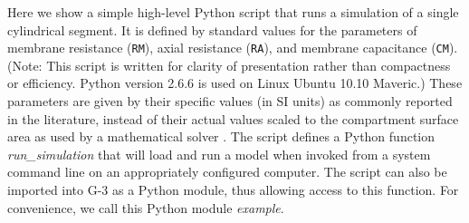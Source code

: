 \documentclass[10pt]{article}
\begin{document}
Here we show a simple high-level Python script that runs a simulation of a single cylindrical segment. It
is defined by standard values for the parameters of membrane
resistance ({\tt RM}), axial resistance ({\tt RA}), and membrane
capacitance ({\tt CM}). (Note: This script
  is written for clarity of presentation rather than compactness or
  efficiency. Python version 2.6.6 is used on Linux Ubuntu 10.10
  Maveric.)
These parameters are given by their specific values (in SI units) as
commonly reported in the literature, instead of their actual values
scaled to the compartment surface area as used by a mathematical
solver \cite{cornelis04:_neuros_param_handl}. The script defines a
Python function {\it run\_simulation} that will load and run a model when invoked from
a system command line on an appropriately configured computer.  The script
can also be imported into G-3 as a Python module, thus allowing access
to this function.  For convenience, we call this Python module {\it
  example}.
\end{document}
